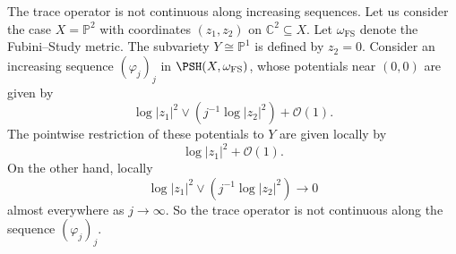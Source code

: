 \begin{example}\label{ex:trace:L407}
    The trace operator is not continuous along increasing sequences. Let us consider the case $X=\mathbb{P}^2$ with coordinates $(z_1,z_2)$ on $\mathbb{C}^2\subseteq X$. Let $\omega_{\mathrm{{FS}}}$ denote the Fubini--Study metric.
    The subvariety $Y\cong \mathbb{P}^1$ is defined by $z_2=0$. Consider an increasing sequence $(\varphi_j)_j$ in $\PSH(X,\omega_{\mathrm{FS}})$, whose potentials near $(0,0)$ are given by
    \[
    \log |z_1|^2\lor \left( j^{-1}\log |z_2|^2\right)+\mathcal{O}(1).
    \]
    The pointwise restriction of these potentials to $Y$ are given locally by
    \[
    \log |z_1|^2+\mathcal{O}(1).
    \]
    On the other hand, locally
    \[
    \log |z_1|^2\lor \left( j^{-1}\log |z_2|^2\right)\to 0
    \]
    almost everywhere as $j\to\infty$. So the trace operator is not continuous along the sequence $(\varphi_j)_j$.
\end{example}



